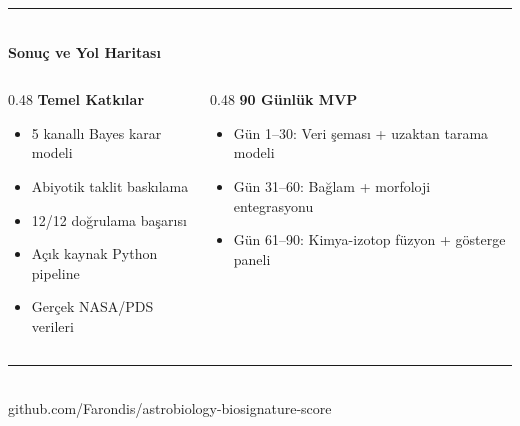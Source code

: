 \documentclass[aspectratio=169,11pt]{beamer}
\begin{document}
{
\begin{frame}[plain]
\vfill
\begin{center}
{\color{cFusion}\rule{0.55\textwidth}{1pt}}\\[10pt]
{\Large\bfseries\color{white}Sonuç ve Yol Haritası}\\[14pt]

\begin{minipage}{0.82\textwidth}
\color{gray!80}
\begin{columns}[T]
\begin{column}{0.48\textwidth}
\textbf{\color{cFusion}Temel Katkılar}
\begin{itemize}\small\color{gray!90}
  \item 5 kanallı Bayes karar modeli
  \item Abiyotik taklit baskılama
  \item 12/12 doğrulama başarısı
  \item Açık kaynak Python pipeline
  \item Gerçek NASA/PDS verileri
\end{itemize}
\end{column}
\begin{column}{0.48\textwidth}
\textbf{\color{cFusion}90 Günlük MVP}
\begin{itemize}\small\color{gray!90}
  \item[\color{cRemote}\textbullet] Gün 1--30: Veri şeması + uzaktan tarama modeli
  \item[\color{cContext}\textbullet] Gün 31--60: Bağlam + morfoloji entegrasyonu
  \item[\color{cChem}\textbullet] Gün 61--90: Kimya-izotop füzyon + gösterge paneli
\end{itemize}
\end{column}
\end{columns}
\end{minipage}

\vspace{16pt}
{\color{cFusion}\rule{0.55\textwidth}{1pt}}\\[8pt]
{\small\color{gray!50} github.com/Farondis/astrobiology-biosignature-score}
\end{center}
\vfill
\end{frame}
}
\end{document}
